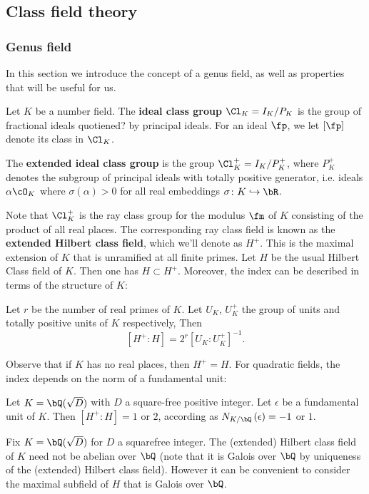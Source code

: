 \subsection{Class field theory}
\subsubsection{Genus field}

In this section we introduce the concept of a genus field, as well as properties that will be useful for us.

Let $K$ be a number field. The \textbf{ideal class group} $\Cl_K = I_K / P_K$ is the group of fractional ideals quotiened{\color{red}?} by principal ideals.
For an ideal $\fp$, we let $[\fp]$ denote its class in $\Cl_K$.

The \textbf{extended ideal class group} is the group $\Cl_K^{+} = I_K / P_K^{+}$, where
$P_K^{+}$ denotes the subgroup of principal ideals with totally positive generator, i.e. ideals $\alpha \cO_K$ where $\sigma(\alpha) > 0$ for all real embeddings $\sigma \colon K \emb \bR$.

Note that $\Cl_K^{+}$ is the ray class group for the modulus $\fm$ of $K$ consisting of the product of all real places. The corresponding ray class field is known as the \textbf{extended Hilbert class field}, which we'll denote as $H^{+}$. This is the maximal extension of $K$ that is unramified at all finite primes. Let $H$ be the usual Hilbert Class field of $K$. Then one has $H \subset H^{+}$. Moreover, the index can be described in terms of the structure of $K$:

\begin{thm}
    Let $r$ be the number of real primes of $K$. Let $U_K$, $U_K^{+}$ the group of units and totally positive units of $K$ respectively, Then 
    \[ [H^{+} \colon H] = 2^r [U_K \colon U_K^{+}]^{-1} .\]
\end{thm}
Observe that if $K$ has no real places, then $H^{+} = H$. For quadratic fields, the index depends on the norm of a fundamental unit:

\begin{cor}
    Let $K = \bQ(\sqrt{D})$ with $D$ a square-free positive integer. Let $\epsilon$ be a fundamental unit of $K$. Then $[H^{+} \colon H] = 1$ or $2$, according as $N_{K / \bQ}\left(\epsilon\right) = -1$ or $1$. 
\end{cor}


Fix $K = \bQ(\sqrt{D})$ for $D$ a squarefree integer. The (extended) Hilbert class field of $K$ need not be abelian over $\bQ$ (note that it is Galois over $\bQ$ by uniqueness of the (extended) Hilbert class field). However it can be convenient to consider the maximal subfield of $H$ that is Galois over $\bQ$. 

